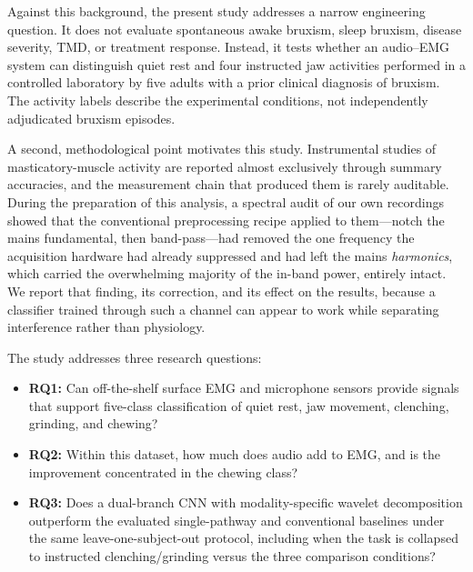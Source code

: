 \documentclass[pdflatex,sn-nature,iicol]{sn-jnl}
\begin{document}
Against this background, the present study addresses a narrow engineering question. It does not evaluate spontaneous awake bruxism, sleep bruxism, disease severity, TMD, or treatment response. Instead, it tests whether an audio--EMG system can distinguish quiet rest and four instructed jaw activities performed in a controlled laboratory by five adults with a prior clinical diagnosis of bruxism. The activity labels describe the experimental conditions, not independently adjudicated bruxism episodes.

A second, methodological point motivates this study. Instrumental studies of masticatory-muscle activity are reported almost exclusively through summary accuracies, and the measurement chain that produced them is rarely auditable. During the preparation of this analysis, a spectral audit of our own recordings showed that the conventional preprocessing recipe applied to them---notch the mains fundamental, then band-pass---had removed the one frequency the acquisition hardware had already suppressed and had left the mains \emph{harmonics}, which carried the overwhelming majority of the in-band power, entirely intact. We report that finding, its correction, and its effect on the results, because a classifier trained through such a channel can appear to work while separating interference rather than physiology.

The study addresses three research questions:

\begin{itemize}
    \item \textbf{RQ1:} Can off-the-shelf surface EMG and microphone sensors provide signals that support five-class classification of quiet rest, jaw movement, clenching, grinding, and chewing?
    \item \textbf{RQ2:} Within this dataset, how much does audio add to EMG, and is the improvement concentrated in the chewing class?
    \item \textbf{RQ3:} Does a dual-branch CNN with modality-specific wavelet decomposition outperform the evaluated single-pathway and conventional baselines under the same leave-one-subject-out protocol, including when the task is collapsed to instructed clenching/grinding versus the three comparison conditions?
\end{itemize}
\end{document}
